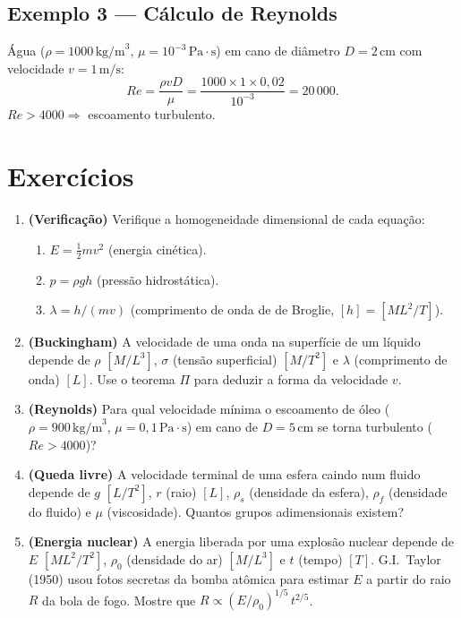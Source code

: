 \documentclass[12pt,a4paper]{article}
\begin{document}
\subsection*{Exemplo 3 --- C\'alculo de Reynolds}
\'Agua ($\rho=1000\,\text{kg/m}^3$, $\mu=10^{-3}\,\text{Pa}\cdot\text{s}$) em cano de di\^ametro $D=2\,\text{cm}$ com velocidade $v=1\,\text{m/s}$:
\[
Re = \frac{\rho v D}{\mu} = \frac{1000 \times 1 \times 0{,}02}{10^{-3}} = 20\,000.
\]
$Re > 4000 \Rightarrow$ escoamento turbulento.

\section*{Exerc\'icios}

\begin{enumerate}
  \item \textbf{(Verifica\c{c}\~ao)} Verifique a homogeneidade dimensional de cada equa\c{c}\~ao:
    \begin{enumerate}
      \item[$a.$] $E = \frac{1}{2}mv^2$ (energia cin\'etica).
      \item[$b.$] $p = \rho g h$ (press\~ao hidrost\'atica).
      \item[$c.$] $\lambda = h/(mv)$ (comprimento de onda de de Broglie, $[h]=[ML^2/T]$).
    \end{enumerate}
  
  \item \textbf{(Buckingham)} A velocidade de uma onda na superf\'icie de um l\'iquido depende de $\rho$ $[M/L^3]$, $\sigma$ (tens\~ao superficial) $[M/T^2]$ e $\lambda$ (comprimento de onda) $[L]$. Use o teorema $\Pi$ para deduzir a forma da velocidade $v$.
  
  \item \textbf{(Reynolds)} Para qual velocidade m\'inima o escoamento de \'oleo ($\rho=900\,\text{kg/m}^3$, $\mu=0{,}1\,\text{Pa}\cdot\text{s}$) em cano de $D=5\,\text{cm}$ se torna turbulento ($Re > 4000$)?
  
  \item \textbf{(Queda livre)} A velocidade terminal de uma esfera caindo num fluido depende de $g$ $[L/T^2]$, $r$ (raio) $[L]$, $\rho_s$ (densidade da esfera), $\rho_f$ (densidade do fluido) e $\mu$ (viscosidade). Quantos grupos adimensionais existem?
  
  \item \textbf{(Energia nuclear)} A energia liberada por uma explos\~ao nuclear depende de $E$ $[ML^2/T^2]$, $\rho_0$ (densidade do ar) $[M/L^3]$ e $t$ (tempo) $[T]$. G.I.\ Taylor (1950) usou fotos secretas da bomba at\^omica para estimar $E$ a partir do raio $R$ da bola de fogo. Mostre que $R \propto (E/\rho_0)^{1/5}\,t^{2/5}$.
  

\end{enumerate}
\end{document}

